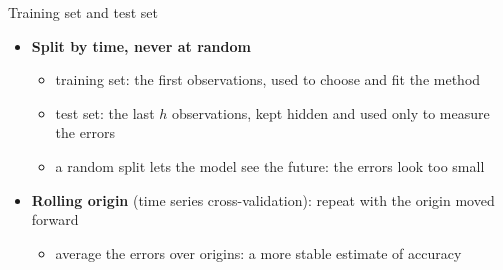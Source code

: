 \begin{frame}{Training set and test set}
\itemsize{\footnotesize}
\centering
{}
\begin{itemize}
    \item \textbf{Split by time, never at random}
    \begin{itemize}
        \item training set: the first observations, used to choose and fit the method
        \item test set: the last $h$ observations, kept hidden and used only to measure the errors
        \item a random split lets the model see the future: the errors look too small
    \end{itemize}
    \item \textbf{Rolling origin} (time series cross-validation): repeat with the origin moved forward
    \begin{itemize}
        \item average the errors over origins: a more stable estimate of accuracy
    \end{itemize}
\end{itemize}
\end{frame}

